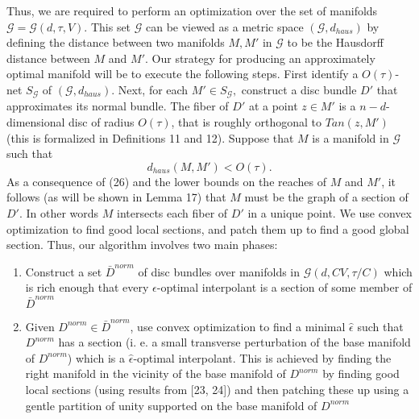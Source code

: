 \documentclass{ujarticle}
\begin{document}
Thus, we are required to perform an optimization over the set of manifolds $\mathcal{G} = \mathcal{G}(d,\tau,V)$.
This set $\mathcal{G}$ can be viewed as a metric space $(\mathcal{G}, d_{haus})$ by defining the distance
between two manifolds $M,M'$ in $\mathcal{G}$ to be
the Hausdorff distance between $M$ and $M'$.
Our strategy for producing an approximately optimal manifold
will be to execute the following steps. First identify a $O(\tau)$-net $S_{\mathcal{G}}$ of $(\mathcal{G},d_{haus})$.
Next, for each $M' \in S_{\mathcal{G}},$
construct a disc bundle $D'$ that approximates its normal bundle. The fiber of $D'$ at a point $z \in M'$ is
a $n - d$-dimensional disc of radius $O(\tau)$, that is roughly orthogonal to $Tan(z,M')$ (this is formalized in
Definitions 11 and 12).
Suppose that $M$ is a manifold in $\mathcal{G}$ such that
\begin{equation*}
  d_{haus}(M,M') < O(\tau).
\end{equation*}
As a consequence of (26) and the lower bounds on the reaches of $M$ and $M'$,
it follows (as will be shown in Lemma 17) that $M$ must be the graph of a section of $D'$.
In other words $M$ intersects each fiber of $D'$ in a unique point.
We use convex optimization to find good local sections, and patch them up to find a good
global section. Thus, our algorithm involves two main phases:
\begin{enumerate}
  \item Construct a set $\bar{D}^{norm}$ of disc bundles over manifolds in $\mathcal{G}(d,CV,\tau/C)$
  which is rich enough that every $\epsilon$-optimal interpolant is a section of some member of $\bar{D}^{norm}$
  \item Given $D^{norm} \in \bar{D}^{norm}$, use convex optimization to find a minimal
   $\hat{\epsilon}$ such that $D^{norm}$ has a section
(i. e. a small transverse perturbation of the base manifold of $D^{norm}$) which is a $\hat{\epsilon}$-optimal interpolant.
This is achieved by finding the right manifold in the vicinity of the base manifold of $D^{norm}$ by finding
good local sections (using results from [23, 24]) and then patching these up using a gentle partition
of unity supported on the base manifold of $D^{norm}$
\end{enumerate}
\end{document}

